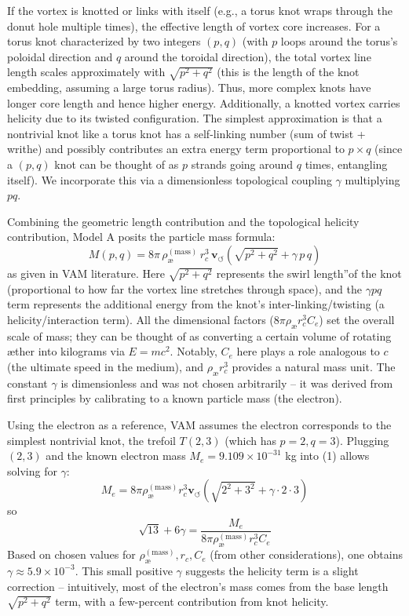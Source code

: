 If the vortex is knotted or links with itself (e.g., a torus knot wraps through the donut hole multiple times), the effective length of vortex core increases. For a torus knot characterized by two integers $(p, q)$ (with $p$ loops around the torus's poloidal direction and $q$ around the toroidal direction), the total vortex line length scales approximately with $\sqrt{p^2+q^2}$ (this is the length of the knot embedding, assuming a large torus radius). Thus, more complex knots have longer core length and hence higher energy. Additionally, a knotted vortex carries helicity due to its twisted configuration. The simplest approximation is that a nontrivial knot like a torus knot has a self-linking number (sum of twist + writhe) and possibly contributes an extra energy term proportional to $p \times q$ (since a $(p,q)$ knot can be thought of as $p$ strands going around $q$ times, entangling itself). We incorporate this via a dimensionless topological coupling $\gamma$ multiplying $p q$.

Combining the geometric length contribution and the topological helicity contribution, Model A posits the particle mass formula:
\begin{equation}
    \boxed{  M(p,q) = 8\pi\,\rho_{\text{\ae}}^{(\text{mass})}\,r_c^3\,\mathbf{v}_{\scriptscriptstyle\boldsymbol{\circlearrowleft}} \left(\sqrt{p^2 + q^2} + \gamma\, p\,q\right)     }
\end{equation}
as given in VAM literature. Here $\sqrt{p^2+q^2}$ represents the \grqq swirl length\textquotedblright of the knot (proportional to how far the vortex line stretches through space), and the $\gamma p q$ term represents the additional energy from the knot's inter-linking/twisting (a helicity/interaction term). All the dimensional factors ($8\pi \rho_{\text{\ae}} r_c^3 C_e$) set the overall scale of mass; they can be thought of as converting a certain volume of rotating æther into kilograms via $E=mc^2$. Notably, $C_e$ here plays a role analogous to $c$ (the ultimate speed in the medium), and $\rho_{\text{\ae}} r_c^3$ provides a natural mass unit. The constant $\gamma$ is dimensionless and was not chosen arbitrarily – it was derived from first principles by calibrating to a known particle mass (the electron).

Using the electron as a reference, VAM assumes the electron corresponds to the simplest nontrivial knot, the trefoil $T(2,3)$ (which has $p=2,q=3$). Plugging $(2,3)$ and the known electron mass $M_e = 9.109\times10^{-31}$ kg into (1) allows solving for $\gamma$:
\[
    M_e = 8\pi \rho_{\text{\ae}}^{(\text{mass})} r_c^3 \mathbf{v}_{\scriptscriptstyle\boldsymbol{\circlearrowleft}} \left(\sqrt{2^2+3^2} + \gamma \cdot 2\cdot3\right)
\]
so
\[
    \sqrt{13} + 6\gamma = \frac{M_e}{8\pi \rho_{\text{\ae}}^{(\text{mass})} r_c^3 C_e}
\]
Based on chosen values for $\rho_{\text{\ae}}^{(\text{mass})}, r_c, C_e$ (from other considerations), one obtains $\gamma \approx 5.9\times10^{-3}$. This small positive $\gamma$ suggests the helicity term is a slight correction -- intuitively, most of the electron's mass comes from the base length $\sqrt{p^2+q^2}$ term, with a few-percent contribution from knot helicity.

